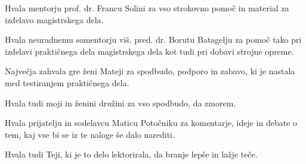 Hvala mentorju prof. dr. Francu Solini za vso strokovno pomoč in material za izdelavo magistrskega dela.

Hvala neuradnemu somentorju viš. pred. dr. Borutu Batagelju za pomoč tako pri izdelavi praktičnega dela magistrskega dela kot tudi pri dobavi strojne opreme.

Največja zahvala gre ženi Mateji za spodbudo, podporo in zabavo, ki je nastala med testiranjem praktičnega dela.

Hvala tudi moji in ženini družini za vso spodbudo, da zmorem.

Hvala prijatelju in sodelavcu Maticu Potočniku za komentarje, ideje in debate o tem, kaj vse bi se iz te naloge še dalo narediti.

Hvala tudi Teji, ki je to delo lektorirala, da branje lepše in lažje teče.
